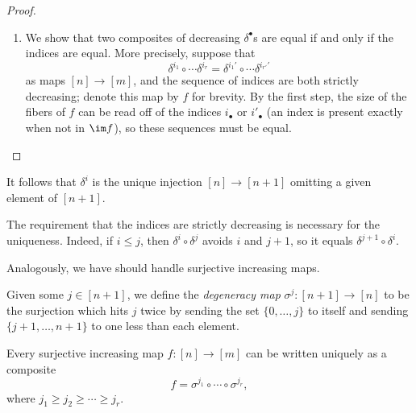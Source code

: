 \documentclass[../notes.tex]{subfiles}
\begin{document}
\begin{proof}
\begin{enumerate}
		\item We show that two composites of decreasing $\delta^\bullet$s are equal if and only if the indices are equal. More precisely, suppose that
		\[\delta^{i_1}\circ\cdots\delta^{i_r}=\delta^{i_1'}\circ\cdots\delta^{i_{r'}'}\]
		as maps $[n]\to[m]$, and the sequence of indices are both strictly decreasing; denote this map by $f$ for brevity. By the first step, the size of the fibers of $f$ can be read off of the indices $i_\bullet$ or $i'_\bullet$ (an index is present exactly when not in $\im f$), so these sequences must be equal.
		\qedhere
	\end{enumerate}
\end{proof}
\begin{remark} \label{rem:delta-relation}
	It follows that $\delta^i$ is the unique injection $[n]\to[n+1]$ omitting a given element of $[n+1]$.
\end{remark}
\begin{remark}
	The requirement that the indices are strictly decreasing is necessary for the uniqueness. Indeed, if $i\le j$, then $\delta^i\circ\delta^j$ avoids $i$ and $j+1$, so it equals $\delta^{j+1}\circ\delta^i$.
\end{remark}
Analogously, we have should handle surjective increasing maps.
\begin{definition}
	Given some $j\in[n+1]$, we define the \textit{degeneracy map} $\sigma^j\colon[n+1]\to[n]$ to be the surjection which hits $j$ twice by sending the set $\{0,\ldots,j\}$ to itself and sending $\{j+1,\ldots,n+1\}$ to one less than each element.
\end{definition}
\begin{lemma} \label{lem:classify-surj}
	Every surjective increasing map $f\colon[n]\to[m]$ can be written uniquely as a composite
	\[f=\sigma^{j_1}\circ\cdots\circ\sigma^{j_r},\]
	where $j_1\ge j_2\ge \cdots\ge j_r$.
\end{lemma}
\end{document}
